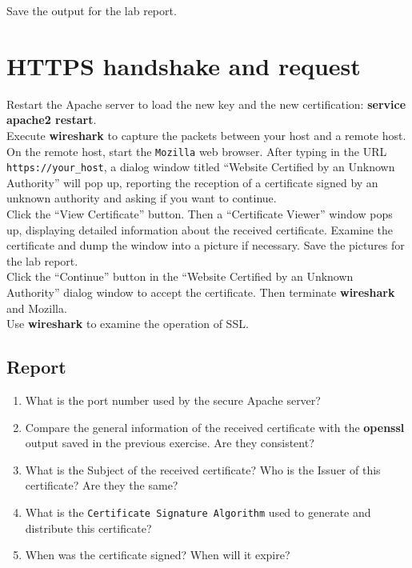 \documentclass[10pt,a4paper]{article}
\numberwithin{equation}{section}
\numberwithin{figure}{section}
\numberwithin{table}{section}
\begin{document}
	Save the output for the lab report.

\section{HTTPS handshake and request}
	Restart the Apache server to load the new key and the new certification: \textbf{service apache2 restart}.\\
	Execute \textbf{wireshark} to capture the packets between your host and a remote host.\\
	On the remote host, start the \texttt{Mozilla} web browser. After typing in the URL \texttt{https://your\_host}, a dialog window titled “Website Certified by an Unknown Authority” will pop up, reporting the reception of a certificate signed by an unknown authority and asking if you want to continue.\\
	Click the “View Certificate” button. Then a “Certificate Viewer” window pops up, displaying detailed information about the received certificate. Examine the certificate and dump the window into a picture if necessary. Save the pictures for the lab report.\\
	Click the “Continue” button in the “Website Certified by an Unknown Authority” dialog window to accept the certificate. Then terminate \textbf{wireshark} and Mozilla.\\
	Use \textbf{wireshark} to examine the operation of SSL.
	
	
	\subsection*{Report}
	\begin{enumerate}
		\setlength{\itemindent}{0pt}
		\item What is the port number used by the secure Apache server?
		\item Compare the general information of the received certificate with the \textbf{openssl} output saved in the previous exercise. Are they consistent?
		\item What is the Subject of the received certificate? Who is the Issuer of this certificate? Are they the same?
		\item What is the \texttt{Certificate Signature Algorithm} used to generate and distribute this certificate?
		\item When was the certificate signed? When will it expire?
	\end{enumerate}
\end{document}
